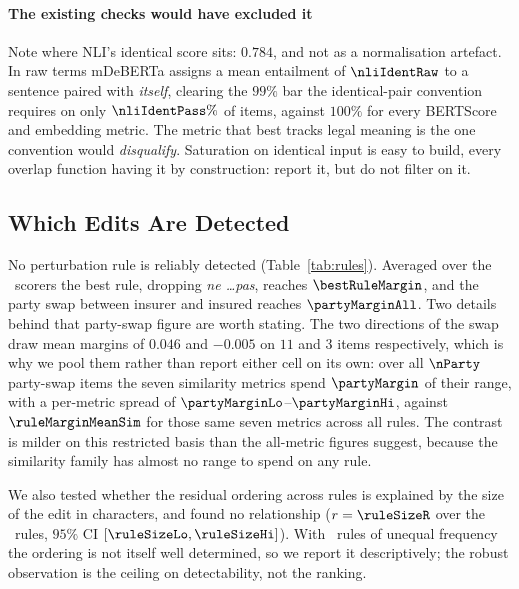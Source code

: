\documentclass{BVP_JCLLT}
\begin{document}
\paragraph{The existing checks would have excluded it}
Note where NLI's identical score sits: $0.784$, and not as a normalisation
artefact. In raw terms mDeBERTa assigns a mean entailment of $\nliIdentRaw$ to a
sentence paired with \emph{itself}, clearing the $99\%$ bar the identical-pair
convention requires on only $\nliIdentPass\%$ of items, against $100\%$ for
every BERTScore and embedding metric. The metric that best tracks legal meaning
is the one convention would \emph{disqualify}. Saturation on identical input is
easy to build, every overlap function having it by construction: report it, but
do not filter on it.

\subsection{Which Edits Are Detected}\label{sec:rules}

No perturbation rule is reliably detected (Table~\ref{tab:rules}). Averaged over
the \nMetricsChallenged\ scorers the best rule, dropping \emph{ne \dots pas},
reaches $\bestRuleMargin$, and the party swap between insurer and insured
reaches $\partyMarginAll$. Two details behind that party-swap figure are worth
stating. The two directions of the swap draw mean margins of $0.046$ and
$-0.005$ on $11$ and $3$ items respectively, which is why we pool them rather
than report either cell on its own: over all $\nParty$ party-swap items the
seven similarity metrics spend $\partyMargin$ of their range, with a per-metric
spread of $\partyMarginLo$--$\partyMarginHi$, against $\ruleMarginMeanSim$ for
those same seven metrics across all rules. The contrast is milder on this
restricted basis than the all-metric figures suggest, because the similarity
family has almost no range to spend on any rule.

We also tested whether the residual ordering across rules is explained by the
size of the edit in characters, and found no relationship ($r=\ruleSizeR$ over
the \nRules\ rules, $95\%$ CI $[\ruleSizeLo, \ruleSizeHi]$). With \nRules\ rules
of unequal frequency the ordering is not itself well determined, so we report it
descriptively; the robust observation is the ceiling on detectability, not the
ranking.

\begin{table}
\centering
\caption{\textsc{LexFlip} margin by perturbation rule, averaged over the metrics
in Table~\ref{tab:challenge}. \emph{worst} is the lowest margin any single
metric assigns that rule. A margin of $1$ would mean the metric treats a legally
flipped sentence exactly as it treats an unrelated one.}\label{tab:rules}
\small

\end{table}
\end{document}

